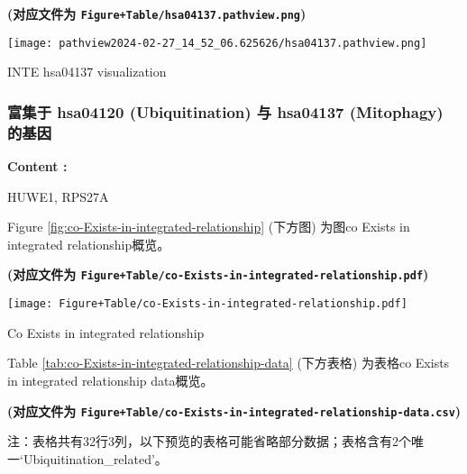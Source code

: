 \documentclass[
]{article}
\begin{document}
\textbf{(对应文件为 \texttt{Figure+Table/hsa04137.pathview.png})}

\def\@captype{figure}
\begin{center}
\texttt{[image: pathview2024-02-27\_14\_52\_06.625626/hsa04137.pathview.png]}
\caption{INTE hsa04137 visualization}\label{fig:INTE-hsa04137-visualization}
\end{center}

\hypertarget{path-intersect}{%
\subsubsection{富集于 hsa04120 (Ubiquitination) 与 hsa04137 (Mitophagy) 的基因}\label{path-intersect}}

\begin{center}\begin{tcolorbox}[colback=gray!10, colframe=gray!50, width=0.9\linewidth, arc=1mm, boxrule=0.5pt]
\textbf{
Content
:}

\vspace{0.5em}

    HUWE1, RPS27A

\vspace{2em}
\end{tcolorbox}
\end{center}

Figure \ref{fig:co-Exists-in-integrated-relationship} (下方图) 为图co Exists in integrated relationship概览。

\textbf{(对应文件为 \texttt{Figure+Table/co-Exists-in-integrated-relationship.pdf})}

\def\@captype{figure}
\begin{center}
\texttt{[image: Figure+Table/co-Exists-in-integrated-relationship.pdf]}
\caption{Co Exists in integrated relationship}\label{fig:co-Exists-in-integrated-relationship}
\end{center}

Table \ref{tab:co-Exists-in-integrated-relationship-data} (下方表格) 为表格co Exists in integrated relationship data概览。

\textbf{(对应文件为 \texttt{Figure+Table/co-Exists-in-integrated-relationship-data.csv})}

\begin{center}\begin{tcolorbox}[colback=gray!10, colframe=gray!50, width=0.9\linewidth, arc=1mm, boxrule=0.5pt]注：表格共有32行3列，以下预览的表格可能省略部分数据；表格含有2个唯一`Ubiquitination\_related'。
\end{tcolorbox}
\end{center}
\end{document}
